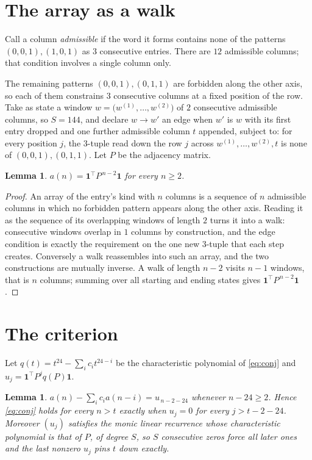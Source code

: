 \documentclass[11pt,a4paper]{article}
\theoremstyle{plain}
\newtheorem{lemma}[theorem]{Lemma}
\theoremstyle{definition}
\begin{document}
\section{The array as a walk}

Call a column \emph{admissible} if the word it forms contains none of the patterns
$(0,0,1), (1,0,1)$ as $3$ consecutive entries. There are $12$ admissible columns; that condition
involves a single column only.

The remaining patterns $(0,0,1), (0,1,1)$ are forbidden along the other axis, so each of them
constrains $3$ consecutive columns at a fixed position of the row. Take as state a
window $w=\bigl(w^{(1)},\dots,w^{(2)}\bigr)$ of $2$ consecutive admissible
columns, so $S=144$, and declare $w\to w'$ an edge when $w'$ is $w$ with its first entry
dropped and one further admissible column $t$ appended, subject to: for every position
$j$, the $3$-tuple read down the row $j$ across $w^{(1)},\dots,w^{(2)},t$
is none of $(0,0,1), (0,1,1)$. Let $P$ be the adjacency matrix.

\begin{lemma}\label{lem:walk}
$a(n)=\mathbf{1}^{\!\top}P^{\,n-2}\mathbf{1}$ for every $n\ge2$.
\end{lemma}

\begin{proof}
An array of the entry's kind with $n$ columns is a sequence of $n$ admissible columns in
which no forbidden pattern appears along the other axis. Reading it as the sequence of its
overlapping windows of length $2$ turns it into a walk: consecutive windows overlap in
$1$ columns by construction, and the edge condition is exactly the requirement on the one
new $3$-tuple that each step creates. Conversely a walk reassembles into such an array,
and the two constructions are mutually inverse. A walk of length $n-2$ visits $n-1$
windows, that is $n$ columns; summing over all starting and ending states gives
$\mathbf{1}^{\!\top}P^{\,n-2}\mathbf{1}$.
\end{proof}

\section{The criterion}

Let $q(t)=t^{24}-\sum_i c_i t^{24-i}$ be the characteristic polynomial of
\eqref{eq:conj} and $u_j=\mathbf{1}^{\!\top}P^{j}q(P)\mathbf{1}$.

\begin{lemma}\label{lem:crit}
$a(n)-\sum_i c_i a(n-i)=u_{\,n-2-24}$ whenever $n-24\ge2$. Hence
\eqref{eq:conj} holds for every $n>t$ exactly when $u_j=0$ for every
$j>t-2-24$. Moreover $(u_j)$ satisfies the monic linear recurrence whose
characteristic polynomial is that of $P$, of degree $S$, so $S$ consecutive zeros force all
later ones and the last nonzero $u_j$ pins $t$ down exactly.
\end{lemma}
\end{document}
